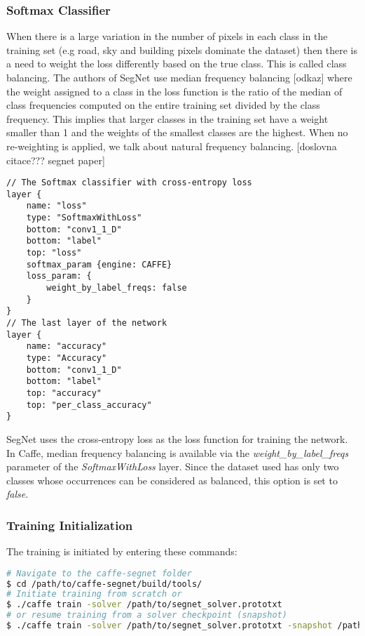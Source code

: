 \subsubsection{Softmax Classifier}

When there is a large variation in the number of pixels in each class in the training set (e.g road, sky and building pixels dominate the dataset) then there is a need to weight the loss differently based on the true class. This is called class balancing. The authors of SegNet use median frequency balancing [odkaz] where the weight assigned to a class in the loss function is the ratio of the median of class frequencies computed on the entire training set divided by the class frequency. This implies that larger classes in the training set have a weight smaller than 1 and the weights of the smallest classes are the highest. When no re-weighting is applied, we talk about natural frequency balancing. [doslovna citace??? segnet paper]

\begin{lstlisting}
// The Softmax classifier with cross-entropy loss
layer {
	name: "loss"
	type: "SoftmaxWithLoss"
	bottom: "conv1_1_D"
	bottom: "label"
	top: "loss"
	softmax_param {engine: CAFFE}
	loss_param: {
		weight_by_label_freqs: false	     
	}
}
// The last layer of the network
layer {
	name: "accuracy"
	type: "Accuracy"
	bottom: "conv1_1_D"
	bottom: "label"
	top: "accuracy"
	top: "per_class_accuracy"
}
\end{lstlisting}


SegNet uses the cross-entropy loss as the loss function for training the network. In Caffe, median frequency balancing is available via the \textit{weight\_by\_label\_freqs} parameter of the \textit{SoftmaxWithLoss} layer. Since the dataset used has only two classes whose occurrences can be considered as balanced, this option is set to \textit{false}. 

\subsubsection{Training Initialization}

\noindent The training is initiated by entering these commands:

\begin{lstlisting}[language=bash]
# Navigate to the caffe-segnet folder
$ cd /path/to/caffe-segnet/build/tools/
# Initiate training from scratch or
$ ./caffe train -solver /path/to/segnet_solver.prototxt
# or resume training from a solver checkpoint (snapshot)
$ ./caffe train -solver /path/to/segnet_solver.prototxt -snapshot /path/to/snapshot_iter_XY.solverstate
\end{lstlisting}

